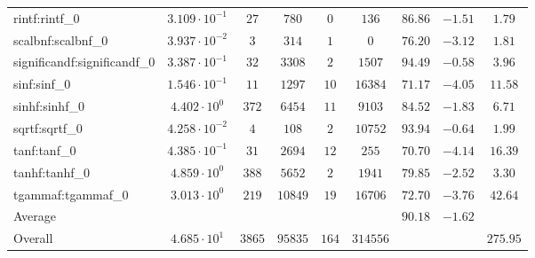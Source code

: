 \begin{tabular}{|l|c|c|c|c|c|c|c|c|}
rintf:rintf\_0               & $ 3.109 \cdot 10^{-1} $ & $ 27     $ & $ 780   $ & $ 0   $ & $ 136    $ & $ 86.86       $ & $ -1.51   $ & $ 1.79    $ \\
scalbnf:scalbnf\_0           & $ 3.937 \cdot 10^{-2} $ & $ 3      $ & $ 314   $ & $ 1   $ & $ 0      $ & $ 76.20       $ & $ -3.12   $ & $ 1.81    $ \\
significandf:significandf\_0 & $ 3.387 \cdot 10^{-1} $ & $ 32     $ & $ 3308  $ & $ 2   $ & $ 1507   $ & $ 94.49       $ & $ -0.58   $ & $ 3.96    $ \\
sinf:sinf\_0                 & $ 1.546 \cdot 10^{-1} $ & $ 11     $ & $ 1297  $ & $ 10  $ & $ 16384  $ & $ 71.17       $ & $ -4.05   $ & $ 11.58   $ \\
sinhf:sinhf\_0               & $ 4.402 \cdot 10^{0}  $ & $ 372    $ & $ 6454  $ & $ 11  $ & $ 9103   $ & $ 84.52       $ & $ -1.83   $ & $ 6.71    $ \\
sqrtf:sqrtf\_0               & $ 4.258 \cdot 10^{-2} $ & $ 4      $ & $ 108   $ & $ 2   $ & $ 10752  $ & $ 93.94       $ & $ -0.64   $ & $ 1.99    $ \\
tanf:tanf\_0                 & $ 4.385 \cdot 10^{-1} $ & $ 31     $ & $ 2694  $ & $ 12  $ & $ 255    $ & $ 70.70       $ & $ -4.14   $ & $ 16.39   $ \\
tanhf:tanhf\_0               & $ 4.859 \cdot 10^{0}  $ & $ 388    $ & $ 5652  $ & $ 2   $ & $ 1941   $ & $ 79.85       $ & $ -2.52   $ & $ 3.30    $ \\
tgammaf:tgammaf\_0           & $ 3.013 \cdot 10^{0}  $ & $ 219    $ & $ 10849 $ & $ 19  $ & $ 16706  $ & $ 72.70       $ & $ -3.76   $ & $ 42.64   $ \\
\hline
Average                      & $                     $ & $        $ & $       $ & $     $ & $        $ & $ 90.18       $ & $ -1.62   $ & $         $ \\
\hline
Overall                      & $ 4.685 \cdot 10^{1}  $ & $ 3865   $ & $ 95835 $ & $ 164 $ & $ 314556 $ & $             $ & $         $ & $ 275.95  $ \\
\hline
\end{tabular}
